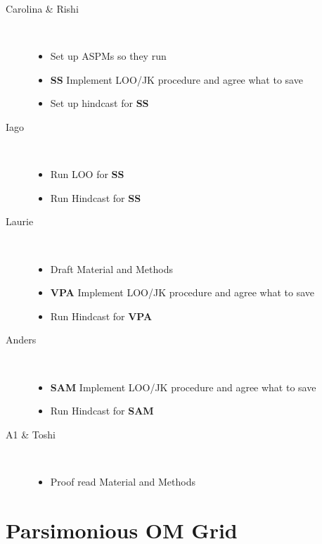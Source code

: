 \documentclass[a4paper,10pt]{article}
\begin{document}
\begin{description}
 \item[Carolina \& Rishi] ~
 \begin{itemize}
  \item Set up ASPMs so they run
  \item  \textbf{SS} Implement LOO/JK procedure and  agree what to save
  \item Set up hindcast for \textbf{SS}
 \end{itemize}

 \item[Iago] ~
  \begin{itemize}
  \item Run LOO for \textbf{SS}
  \item Run Hindcast for \textbf{SS}
 \end{itemize}

 \item[Laurie] ~
  \begin{itemize}
  \item Draft Material and Methods
  \item  \textbf{VPA} Implement LOO/JK procedure and agree what to save 
  \item Run Hindcast for \textbf{VPA}
 \end{itemize}

 \item[Anders] ~
  \begin{itemize}
  \item  \textbf{SAM} Implement LOO/JK procedure and  agree what to save
  \item Run Hindcast for \textbf{SAM}
 \end{itemize}
 
 \item[A1 \& Toshi] ~
  \begin{itemize}
  \item Proof read Material and Methods
 \end{itemize}
 
\end{description}



\newpage
\section*{Parsimonious OM Grid}
\end{document}
